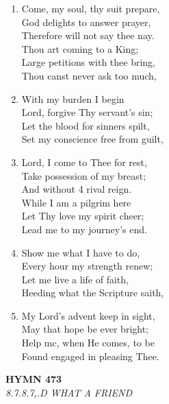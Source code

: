 \documentclass[11pt,a4paper]{article}
\begin{document}
\begin{enumerate}
    \item Come, my soul, thy suit prepare, \\
        God delights to answer prayer, \\
        Therefore will not say thee nay. \\
        Thou art coming to a King; \\
        Large petitions with thee bring, \\
        Thou canst never ask too much,

    \item With my burden I begin \\
        Lord, forgive Thy servant's sin; \\
        Let the blood for sinners spilt, \\
        Set my conscience free from guilt,

    \item Lord, I come to Thee for rest, \\
        Take possession of my breast; \\
        And without 4 rival reign. \\
        While I am a pilgrim here \\
        Let Thy love my spirit cheer; \\
        Lead me to my journey's end.

    \item Show me what I have to do, \\
        Every hour my strength renew; \\
        Let me live a life of faith, \\
        Heeding what the Scripture saith,

    \item My Lord's advent keep in sight, \\
        May that hope be ever bright; \\
        Help mc, when He comes, to be \\
        Found engaged in pleasing Thee.

\end{enumerate}

\newpage
\begin{center}
    {\Large \textbf{HYMN 473}}
    \\
    \textit{8.7.8.7,.D WHAT A FRIEND}
\end{center}
\vspace{1em}
\end{document}
